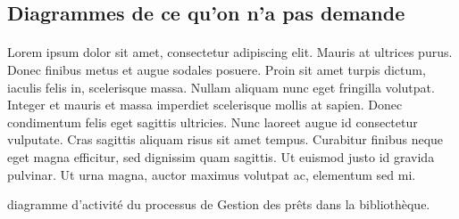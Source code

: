\subsection{Diagrammes de ce qu'on n'a pas demande}
\paragraph{} 
Lorem ipsum dolor sit amet, consectetur adipiscing elit. Mauris at ultrices purus. Donec finibus metus et augue sodales posuere. Proin sit amet turpis dictum, iaculis felis in, scelerisque massa. Nullam aliquam nunc eget fringilla volutpat. Integer et mauris et massa imperdiet scelerisque mollis at sapien. Donec condimentum felis eget sagittis ultricies. Nunc laoreet augue id consectetur vulputate. Cras sagittis aliquam risus sit amet tempus. Curabitur finibus neque eget magna efficitur, sed dignissim quam sagittis. Ut euismod justo id gravida pulvinar. Ut urna magna, auctor maximus volutpat ac, elementum sed mi.

diagramme d’activité du processus de Gestion des prêts dans la bibliothèque.